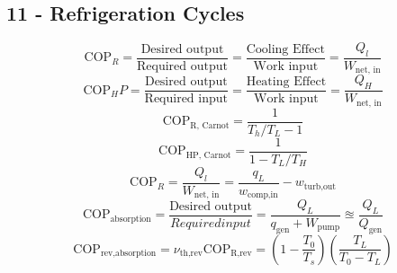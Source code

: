 \documentclass[10pt,landscape]{article}
\begin{document}
\begin{multicols}{3}
\section{11 - Refrigeration Cycles}
\begin{equation}
    \text{COP}_R=\frac{\text{Desired output}}{\text{Required output}}=\frac{\text{Cooling Effect}}{\text{Work input}}=\frac{Q_l}{W_{\text{net, in}}}
\end{equation}
\begin{equation}
    \text{COP}_HP=\frac{\text{Desired output}}{\text{Required input}}=\frac{\text{Heating Effect}}{\text{Work input}}=\frac{Q_H}{W_{\text{net, in}}}
\end{equation}
\begin{equation}
    \text{COP}_{\text{R, Carnot}}=\frac{1}{T_h/T_L-1}
\end{equation}
\begin{equation}
    \text{COP}_{\text{HP, Carnot}}=\frac{1}{1-T_L/T_H}
\end{equation}
\begin{equation}
    \text{COP}_R=\frac{Q_l}{W_{\text{net, in}}}=\frac{q_L}{w_{\text{comp,in}}}-w_{\text{turb,out}}
\end{equation}
\begin{equation}
    \text{COP}_{\text{absorption}}=\frac{\text{Desired output}}{Required input}=\frac{Q_L}{q_{\text{gen}}+W_{\text{pump}}}\approxeq\frac{Q_L}{Q_{\text{gen}}}
\end{equation}
\begin{equation}
    \text{COP}_{\text{rev,absorption}}=\nu_{\text{th,rev}}\text{COP}_{\text{R,rev}}=(1-\frac{T_0}{T_s})(\frac{T_L}{T_0-T_L})
\end{equation}

\end{multicols}
\end{document}
